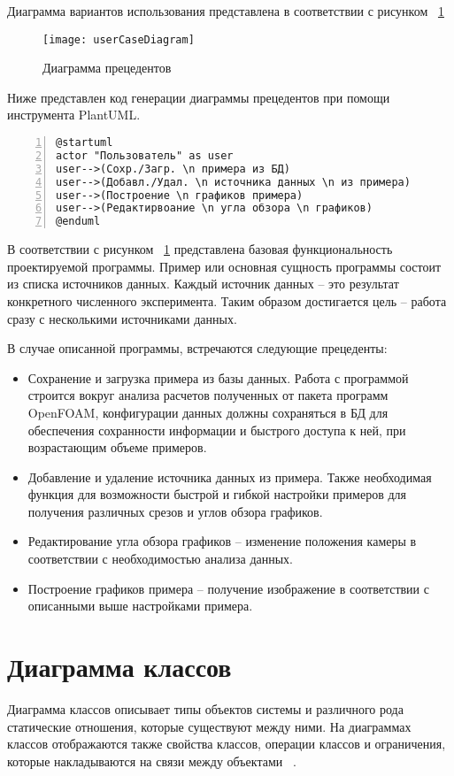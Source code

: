 \documentclass[14pt]{extreport}
\begin{document}
Диаграмма вариантов использования представлена в соответствии с рисунком ~\ref{fig5}
\begin{figure}[H]
\centerline{\texttt{[image: userCaseDiagram]}}
\caption{Диаграмма прецедентов}
\label{fig5}
\end{figure}

Ниже представлен код генерации диаграммы прецедентов при помощи инструмента PlantUML.
\begin{Verbatim}[numbers=left,xleftmargin=5mm,fontsize=\small]
@startuml
actor "Пользователь" as user
user-->(Сохр./Загр. \n примера из БД)
user-->(Добавл./Удал. \n источника данных \n из примера)
user-->(Построение \n графиков примера)
user-->(Редактирвоание \n угла обзора \n графиков)
@enduml
\end{Verbatim}

В соответствии с рисунком ~\ref{fig5} представлена базовая функциональность проектируемой программы. Пример или основная сущность программы состоит из списка источников данных. Каждый источник данных -- это результат конкретного численного эксперимента. Таким образом достигается цель -- работа сразу с несколькими источниками данных.   

В случае описанной программы, встречаются следующие прецеденты:
\begin{itemize}
	\item Сохранение и загрузка примера из базы данных. Работа с программой строится вокруг анализа расчетов полученных от пакета программ OpenFOAM, конфигурации данных должны сохраняться в БД для обеспечения сохранности информации и быстрого доступа к ней, при возрастающим объеме примеров. 
	\item Добавление и удаление источника данных из примера. Также необходимая функция для возможности быстрой и гибкой настройки примеров для получения различных срезов и углов обзора графиков.
	\item Редактирование угла обзора графиков -- изменение положения камеры в соответствии с необходимостью анализа данных.
	\item Построение графиков примера -- получение изображение в соответствии с описанными выше настройками примера.
\end{itemize}

\section{Диаграмма классов}
Диаграмма классов описывает типы объектов системы и различного рода статические отношения, которые существуют между ними. На диаграммах классов отображаются также свойства классов, операции классов и ограничения, которые накладываются на связи между объектами ~\cite{umlDistilled}.
\end{document}
